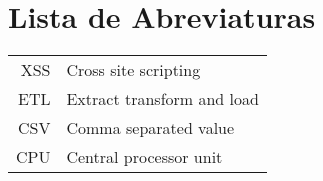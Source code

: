     \newcommand\disablenewpage[1]{{\let\clearpage\par\let\cleardoublepage\par #1}}
    
    \bgroup
    \raggedbottom
    
    
    \disablenewpage{\chapter*{Lista de Abreviaturas}}
    
    \begin{tabular}{rl}
       XSS & Cross site scripting\\
       ETL & Extract transform and load \\
       CSV & Comma separated value \\
       CPU & Central processor unit
    \end{tabular}
    
    
